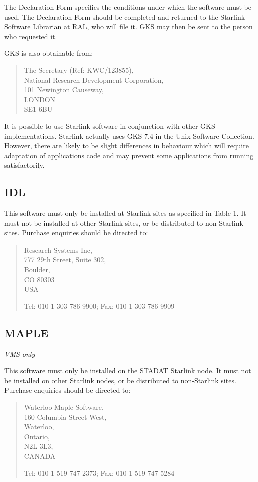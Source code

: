 The Declaration Form specifies the conditions under which the software must be
used. The Declaration Form should be completed and returned to the Starlink
Software Librarian at RAL, who will file it. GKS may then be sent to the person
who requested it.

GKS is also obtainable from:

\begin{verse}
The Secretary (Ref: KWC/123855),\\
National Research Development Corporation,\\
101 Newington Causeway,\\
LONDON\\
SE1 6BU
\end{verse}

It is possible to use Starlink software in conjunction with other GKS
implementations. Starlink actually uses GKS 7.4 in the Unix Software
Collection. However, there are likely to be slight differences in behaviour
which will require adaptation of applications code and may prevent some
applications from running satisfactorily.

\subsection {IDL}

This software must only be installed at Starlink sites as specified in Table 1.
It must not be installed at other Starlink sites, or be distributed to
non-Starlink sites.
Purchase enquiries should be directed to:

\begin{verse}
Research Systems Inc,\\
777 29th Street, Suite 302,\\
Boulder,\\
CO 80303\\
USA

Tel: 010-1-303-786-9900; \hspace{10mm} Fax: 010-1-303-786-9909
\end{verse}

\subsection {MAPLE}

{\em VMS only}

This software must only be installed on the STADAT Starlink node.
It must not be installed on other Starlink nodes, or be distributed to
non-Starlink sites.
Purchase enquiries should be directed to:
\begin{verse}
Waterloo Maple Software,\\
160 Columbia Street West,\\
Waterloo,\\
Ontario,\\
N2L 3L3,\\
CANADA

Tel: 010-1-519-747-2373;  \hspace{10mm} Fax: 010-1-519-747-5284
\end{verse}


